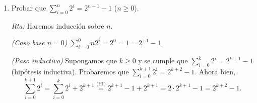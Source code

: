 \documentclass[12pt,spanish,makeidx]{amsbook}
\newcommand{\rta}{\noindent\textit{Rta: }}
\begin{document}
\begin{enumerate}
		{\it (Paso  inductivo) } Supongamos que $k \ge 2$ y el resultado  es cierto para los $h$ tales que  $1 \le h \le k$. Es decir que $u_h = 2^{h+1} + 5^h$ para $1 \le h \le k$ y $k \ge 2$ (hipótesis inductiva), entonces debemos probar que $u_{k+1} = 2^{k+2}+5^{k+1}$. Ahora bien, 
		\begin{equation*}
			\begin{matrix}
				u_{k+1} &=& 7u_{k+1-1} - 10u_{k+1-2}  \hfill &\quad \text{(por definición recursiva)} \hfill \\
				&=& 7u_{k} - 10u_{k-1}  \hfill &\hfill\\
				&=& 7( 2^{k+1} + 5^k) -10 ( 2^{k-1+1} + 5^{k-1})  \hfill &\quad \text{(por hipótesis inductiva})\hfill \\
				&=& 7 \cdot  2^{k+1} + 7 \cdot 5^k -10 \cdot  2^{k} -10 \cdot  5^{k-1} \hfill  & \hfill\\
				&=& 7 \cdot 2 \cdot  2^{k} + 7 \cdot 5 \cdot 5^{k-1} -10 \cdot  2^{k} -10 \cdot  5^{k-1}  \hfill  & \hfill\\
				&=& (7 \cdot 2 -10 ) \cdot  2^{k} + (7 \cdot 5 -10) \cdot 5^{k-1}  \hfill  & \hfill\\
				&=& 4 \cdot  2^{k} + 25 \cdot 5^{k-1}  \hfill  & \hfill\\
				&=& 2^2 \cdot  2^{k} + 5^2 \cdot 5^{k-1}  \hfill  & \hfill\\
				&=& 2^{k+2} + 5^{k+1}  \hfill  & \hfill
			\end{matrix}
		\end{equation*}
		 
		

		\smallskip
		
		\item\label{ej-suma-2-ala-n} Probar que $\sum_{i=0}^n 2^i = 2^{n+1} -1$ ($n \ge 0$). 

		\rta Haremos inducción sobre $n$. 
		
		\textit{(Caso base $n=0$) }  $\sum_{i=0}^0n 2^i = 2^0 = 1 = 2^{+1} -1$.
		
		\textit{(Paso inductivo) } Supongamos que $k\ge 0$ y se cumple que  $\sum_{i=0}^k 2^i = 2^{k+1} -1$ (hipótesis inductiva). Probaremos que  $\sum_{i=0}^{k+1} 2^i = 2^{k+2} -1$. Ahora bien, 
		\begin{equation*}
			\sum_{i=0}^{k+1} 2^i = \sum_{i=0}^{k} 2^i + 2^{k+1} \overset{\text{(HI)}}{=}  2^{k+1} -1 + 2^{k+1} = 2 \cdot 2^{k+1} -1 = 2^{k+2} -1.
		\end{equation*}
		
		
		\smallskip
		

\end{enumerate}
\end{document}
